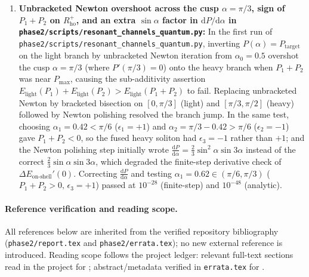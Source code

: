 \documentclass[11pt,a4paper]{article}
\newcommand{\dd}{\mathrm{d}}
\newcommand{\squant}{\texttt{phase2/\allowbreak scripts/\allowbreak resonant\_\allowbreak channels\_\allowbreak quantum.py}}
\theoremstyle{remark}
\begin{document}
\begin{enumerate}
\item \textbf{Unbracketed Newton overshoot across the cusp $\alpha=\pi/3$, sign of $P_1+P_2$ on $R_{\mathrm{ho}}^+$, and an extra $\sin\alpha$ factor in $\dd P/\dd\alpha$ in \squant:}
In the first run of \squant, inverting $P(\alpha) = P_{\mathrm{target}}$ on the
light branch by unbracketed Newton iteration from $\alpha_0=0.5$ overshot the
cusp $\alpha=\pi/3$ (where $P'(\pi/3)=0$) onto the heavy branch when
$P_1+P_2$ was near $P_{\max}$, causing the sub-additivity assertion
$E_{\mathrm{light}}(P_1)+E_{\mathrm{light}}(P_2) > E_{\mathrm{light}}(P_1+P_2)$
to fail. Replacing unbracketed Newton by bracketed bisection on $[0,\pi/3]$
(light) and $[\pi/3,\pi/2]$ (heavy) followed by Newton polishing resolved the
branch jump. In the same test, choosing $\alpha_1=0.42 < \pi/6$ ($\epsilon_1=+1$)
and $\alpha_2=\pi/3-0.42 > \pi/6$ ($\epsilon_2=-1$) gave $P_1+P_2 < 0$, so the
fused heavy soliton had $\epsilon_3 = -1$ rather than $+1$; and the Newton
polishing step initially wrote $\frac{\dd P}{\dd\alpha} = \frac{2}{3}\sin^2\alpha\sin 3\alpha$
instead of the correct $\frac{2}{3}\sin\alpha\sin 3\alpha$, which degraded the
finite-step derivative check of $\Delta E_{\mathrm{on\text{-}shell}}'(0)$.
Correcting $\frac{\dd P}{\dd\alpha}$ and testing $\alpha_1=0.62 \in (\pi/6,\pi/3)$
($P_1+P_2 > 0,\,\epsilon_3=+1$) passed at $10^{-28}$ (finite-step) and $10^{-48}$
(analytic).
\end{enumerate}

\paragraph{Reference verification and reading scope.}
All references below are inherited from the verified repository bibliography
(\texttt{phase2/\allowbreak report.tex} and \texttt{phase2/\allowbreak errata.tex});
no new external reference is introduced. Reading scope follows the project
ledger: relevant full-text sections read in the project for \cite{BC,BD,CZ,DMHC,FK,RS};
abstract/metadata verified in \texttt{errata.tex} for \cite{Dickey,HI,LMK,Zak}.
\end{document}
